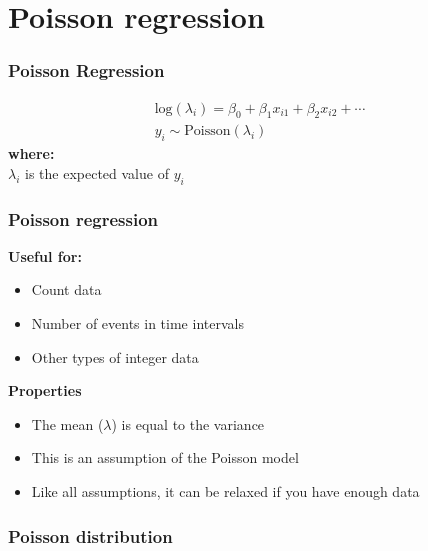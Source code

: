 \documentclass[color=usenames,dvipsnames]{beamer}\usepackage[]{graphicx}\usepackage[]{color}
\begin{document}
\section{Poisson regression}



\begin{frame}
  \frametitle{Poisson Regression}
  \Large
    \begin{gather*}
      \mathrm{log}(\lambda_i) = \beta_0 + \beta_1 x_{i1} + \beta_2 x_{i2} + \cdots \\
      y_i \sim \mathrm{Poisson}(\lambda_i)
  \end{gather*}
  \pause
  {\bf where: \\}
  $\lambda_i$ is the expected value of $y_i$ \\
\end{frame}



\begin{frame}
  \frametitle{Poisson regression}
  \large
  {\bf Useful for:}
  \begin{itemize}
    \item Count data
    \item Number of events in time intervals
    \item Other types of integer data
  \end{itemize}
  \pause
  \vfill
  {\bf Properties}
  \begin{itemize}
    \item The mean ($\lambda$) is equal to the variance
    \item This is an assumption of the Poisson model
    \item Like all assumptions, it can be relaxed if you have enough data
  \end{itemize}
\end{frame}




\begin{frame}[fragile]
  \frametitle{Poisson distribution}



\begin{center}
\end{center}
\end{frame}
\end{document}
